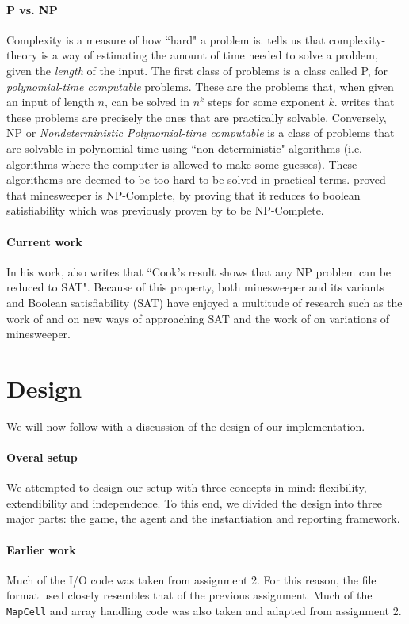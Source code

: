 \documentclass[british]{article}
\newcommand{\code}[1]{\texttt{#1}}
\begin{document}
\paragraph{P vs. NP} Complexity is a measure of how ``hard" a problem is. \cite{Kaye00} tells us that complexity-theory is a way of estimating the amount of time needed to solve a problem, given the \textit{length} of the input. The first class of problems is a class called P, for \textit{polynomial-time computable} problems. These are the problems that, when given an input of length $n$, can be solved in $n^k$ steps for some exponent $k$. \citeauthor{Kaye00} writes that these problems are precisely the ones that are practically solvable. Conversely, NP or \textit{Nondeterministic Polynomial-time computable} is a class of problems that are solvable in polynomial time using ``non-deterministic" algorithms (i.e. algorithms where the computer is allowed to make some guesses). These algorithems are deemed to be too hard to be solved in practical terms.\cite{Kaye00} proved that minesweeper is NP-Complete, by proving that it reduces to boolean satisfiability which was previously proven by \cite{Cook71} to be NP-Complete.
\newpage
\paragraph{Current work} In his work, \cite{Kaye00} also writes that ``Cook's result shows that any NP problem can be reduced to SAT". Because of this property, both minesweeper and its variants and Boolean satisfiability (SAT) have enjoyed a multitude of research such as the work of \cite{Su2016,Mejia-Lavalle2016} and \cite{Meel2014} on new ways of approaching SAT and the work of \cite{Golan2011,Golan2014} on variations of minesweeper.



\section{Design}
\label{design}
We will now follow with a discussion of the design of our implementation.
\paragraph{Overal setup} We attempted to design our setup with three concepts in mind: flexibility, extendibility and independence. To this end, we divided the design into three major parts: the game, the agent and the instantiation and reporting framework.
\paragraph{Earlier work} Much of the I/O code was taken from assignment 2. For this reason, the file format used closely resembles that of the previous assignment. Much of the \code{MapCell} and array handling code was also taken and adapted from assignment 2.
\end{document}
